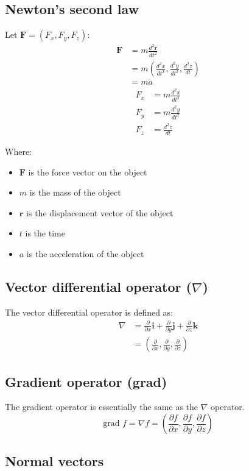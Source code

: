 \documentclass[11pt]{article}
\begin{document}
\subsection{Newton's second law}
\label{sec:orgde145a8}
Let \(\boldsymbol{F} = (F_x, F_y, F_z)\):
\begin{align*}
\boldsymbol{F} &= m \frac{d^2 \boldsymbol{r}}{dt^2} \\
&= m \left(\frac{d^2 x}{dt^2}, \frac{d^2 y}{dt^2}, \frac{d^2 z}{dt} \right) \\
&= ma
\end{align*}
\begin{align*}
F_x &= m \frac{d^2 x}{dt^2} \\
F_y &= m \frac{d^2 y}{dt^2} \\
F_z &= \frac{d^2 z}{dt}
\end{align*}

Where:
\begin{itemize}
\item \(\boldsymbol{F}\) is the force vector on the object
\item \(m\) is the mass of the object
\item \(\boldsymbol{r}\) is the displacement vector of the object
\item \(t\) is the time
\item \(a\) is the acceleration of the object
\end{itemize}
\subsection{Vector differential operator (\(\nabla\))}
\label{sec:org49c336f}
The vector differential operator is defined as:
\begin{align*}
\nabla &= \frac{\partial}{\partial x} \boldsymbol{i} + \frac{\partial}{\partial y} \boldsymbol{j} + \frac{\partial}{\partial z} \boldsymbol{k} \\
&= \left(\frac{\partial}{\partial x}, \frac{\partial}{\partial y}, \frac{\partial}{\partial z} \right)
\end{align*}
\subsection{Gradient operator (grad)}
\label{sec:orgc6eaa30}
The gradient operator is essentially the same as the \(\nabla\) operator.
\[\text{grad } f = \nabla f = \left(\frac{\partial f}{\partial x}, \frac{\partial f}{\partial y}, \frac{\partial f}{\partial z} \right)\]
\subsection{Normal vectors}
\label{sec:org3de83fd}
\end{document}
